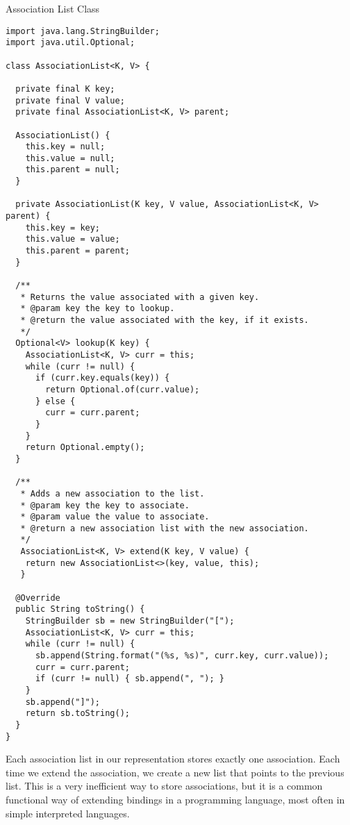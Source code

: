 \begin{cl}[]{Association List Class}
\begin{lstlisting}[language=MyJava]
import java.lang.StringBuilder;
import java.util.Optional;

class AssociationList<K, V> {
  
  private final K key;
  private final V value;
  private final AssociationList<K, V> parent;
  
  AssociationList() {
    this.key = null;
    this.value = null;
    this.parent = null;
  }

  private AssociationList(K key, V value, AssociationList<K, V> parent) {
    this.key = key;
    this.value = value;
    this.parent = parent;
  }
  
  /**
   * Returns the value associated with a given key.
   * @param key the key to lookup.
   * @return the value associated with the key, if it exists.
   */
  Optional<V> lookup(K key) {
    AssociationList<K, V> curr = this;
    while (curr != null) {
      if (curr.key.equals(key)) {
        return Optional.of(curr.value);
      } else {
        curr = curr.parent;
      }
    }
    return Optional.empty();
  }
  
  /**
   * Adds a new association to the list.
   * @param key the key to associate.
   * @param value the value to associate.
   * @return a new association list with the new association.
   */
   AssociationList<K, V> extend(K key, V value) {
    return new AssociationList<>(key, value, this);
   }
  
  @Override
  public String toString() {
    StringBuilder sb = new StringBuilder("[");
    AssociationList<K, V> curr = this;
    while (curr != null) {
      sb.append(String.format("(%s, %s)", curr.key, curr.value));
      curr = curr.parent;
      if (curr != null) { sb.append(", "); }
    }
    sb.append("]");
    return sb.toString();
  }
}
\end{lstlisting}
\end{cl}

Each association list in our representation stores exactly one association. Each time we extend the association, we create a new list that points to the previous list. This is a very inefficient way to store associations, but it is a common functional way of extending bindings in a programming language, most often in simple interpreted languages.